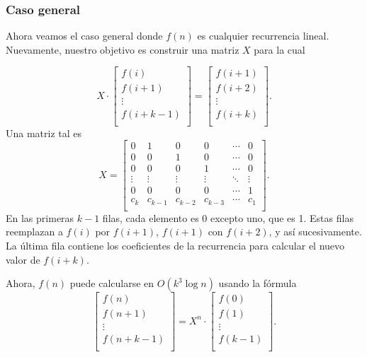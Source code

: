 \subsubsection{Caso general}

Ahora veamos el caso general donde $f(n)$ es cualquier recurrencia lineal.
Nuevamente, nuestro objetivo es construir una matriz $X$ para la cual

\[ X \cdot
    \begin{bmatrix}
        f(i)     \\
        f(i+1)   \\
        \vdots   \\
        f(i+k-1) \\
    \end{bmatrix}
    =
    \begin{bmatrix}
        f(i+1) \\
        f(i+2) \\
        \vdots \\
        f(i+k) \\
    \end{bmatrix}.
\]
Una matriz tal es
\[
    X =
    \begin{bmatrix}
        0      & 1       & 0       & 0       & \cdots & 0      \\
        0      & 0       & 1       & 0       & \cdots & 0      \\
        0      & 0       & 0       & 1       & \cdots & 0      \\
        \vdots & \vdots  & \vdots  & \vdots  & \ddots & \vdots \\
        0      & 0       & 0       & 0       & \cdots & 1      \\
        c_k    & c_{k-1} & c_{k-2} & c_{k-3} & \cdots & c_1    \\
    \end{bmatrix}.
\]
En las primeras $k-1$ filas, cada elemento es 0 excepto uno, que es 1.
Estas filas reemplazan a $f(i)$ por $f(i+1)$, $f(i+1)$ con $f(i+2)$, y así
sucesivamente. La última fila contiene los coeficientes de la recurrencia
para calcular el nuevo valor de $f(i+k)$.

Ahora, $f(n)$ puede calcularse en $O(k^3 \log n)$ usando la fórmula
\[
    \begin{bmatrix}
        f(n)     \\
        f(n+1)   \\
        \vdots   \\
        f(n+k-1) \\
    \end{bmatrix}
    =
    X^n \cdot
    \begin{bmatrix}
        f(0)   \\
        f(1)   \\
        \vdots \\
        f(k-1) \\
    \end{bmatrix}.
\]

